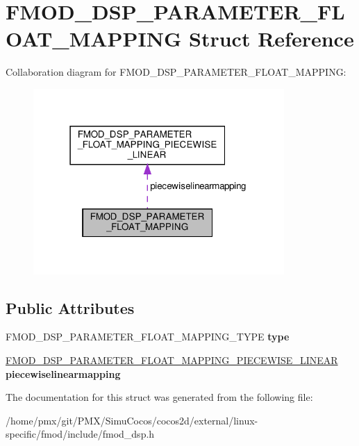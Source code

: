 \hypertarget{structFMOD__DSP__PARAMETER__FLOAT__MAPPING}{}\section{F\+M\+O\+D\+\_\+\+D\+S\+P\+\_\+\+P\+A\+R\+A\+M\+E\+T\+E\+R\+\_\+\+F\+L\+O\+A\+T\+\_\+\+M\+A\+P\+P\+I\+NG Struct Reference}
\label{structFMOD__DSP__PARAMETER__FLOAT__MAPPING}


Collaboration diagram for F\+M\+O\+D\+\_\+\+D\+S\+P\+\_\+\+P\+A\+R\+A\+M\+E\+T\+E\+R\+\_\+\+F\+L\+O\+A\+T\+\_\+\+M\+A\+P\+P\+I\+NG\+:
\nopagebreak
\begin{figure}[H]
\begin{center}
\leavevmode
\includegraphics[width=271pt]{structFMOD__DSP__PARAMETER__FLOAT__MAPPING__coll__graph}
\end{center}
\end{figure}
\subsection*{Public Attributes}
\begin{DoxyCompactItemize}
\item 
\mbox{\label{structFMOD__DSP__PARAMETER__FLOAT__MAPPING_a855eb718fae211c303bb3f993dcaaea7}} 
F\+M\+O\+D\+\_\+\+D\+S\+P\+\_\+\+P\+A\+R\+A\+M\+E\+T\+E\+R\+\_\+\+F\+L\+O\+A\+T\+\_\+\+M\+A\+P\+P\+I\+N\+G\+\_\+\+T\+Y\+PE {\bfseries type}
\item 
\mbox{\label{structFMOD__DSP__PARAMETER__FLOAT__MAPPING_abb8e5ffa44fd3f2d5ef47cc3f8d51112}} 
\hyperlink{structFMOD__DSP__PARAMETER__FLOAT__MAPPING__PIECEWISE__LINEAR}{F\+M\+O\+D\+\_\+\+D\+S\+P\+\_\+\+P\+A\+R\+A\+M\+E\+T\+E\+R\+\_\+\+F\+L\+O\+A\+T\+\_\+\+M\+A\+P\+P\+I\+N\+G\+\_\+\+P\+I\+E\+C\+E\+W\+I\+S\+E\+\_\+\+L\+I\+N\+E\+AR} {\bfseries piecewiselinearmapping}
\end{DoxyCompactItemize}


The documentation for this struct was generated from the following file\+:\begin{DoxyCompactItemize}
\item 
/home/pmx/git/\+P\+M\+X/\+Simu\+Cocos/cocos2d/external/linux-\/specific/fmod/include/fmod\+\_\+dsp.\+h\end{DoxyCompactItemize}
